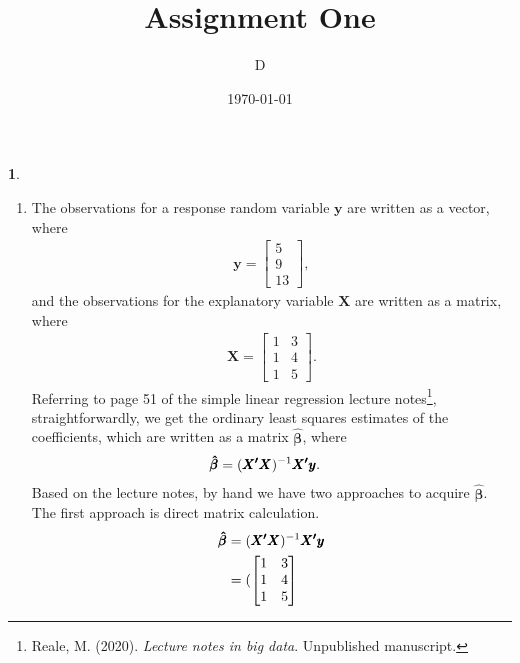 \documentclass[10pt]{article}
\author{D}
\newtheorem{prob}{\bm{$Problem$}}
\begin{document}
\title{Assignment One}
\date{\today}
\maketitle
\thispagestyle{fancy}
\thispagestyle{fancy}

\begin{prob}
\end{prob}
\begin{enumerate}[1)]
\vspace{3mm}

\item
The observations for a response random variable $\pmb{y}$ are written as a vector, where
\begin{align*}
\pmb{y}=
  \begin{bmatrix}
    5\\
    9\\
    13
  \end{bmatrix}
,
\end{align*}
and the observations for the explanatory variable $\pmb{X}$ are written as a matrix, where
\begin{align*}
\pmb{X}=
  \begin{bmatrix}
    1 & 3\\
    1 & 4\\
    1 & 5
  \end{bmatrix}
.
\end{align*}
Referring to page 51 of the simple linear regression lecture notes\footnote{Reale, M. (2020). \textit{Lecture notes in big data}. Unpublished manuscript.}, straightforwardly, we get the ordinary least squares estimates of the coefficients, which are written as a matrix $\pmb{\hat{\beta}}$, where
\begin{align*}
\pmb{\hat{\beta}}&=(\pmb{X\textsuperscript{$\prime$}}\pmb{X})^{-1}\pmb{X\textsuperscript{$\prime$}}\pmb{y}.
\end{align*}
Based on the lecture notes, by hand we have two approaches to acquire $\pmb{\hat{\beta}}$.\\
The first approach is direct matrix calculation.\\
\begin{align*}
\pmb{\hat{\beta}}&=(\pmb{X\textsuperscript{$\prime$}}\pmb{X})^{-1}\pmb{X\textsuperscript{$\prime$}}\pmb{y}\\
&=(
  \begin{bmatrix}
    1 & 3\\
    1 & 4\\
    1 & 5
  \end{bmatrix}

\end{align*}
\end{enumerate}
\end{document}
